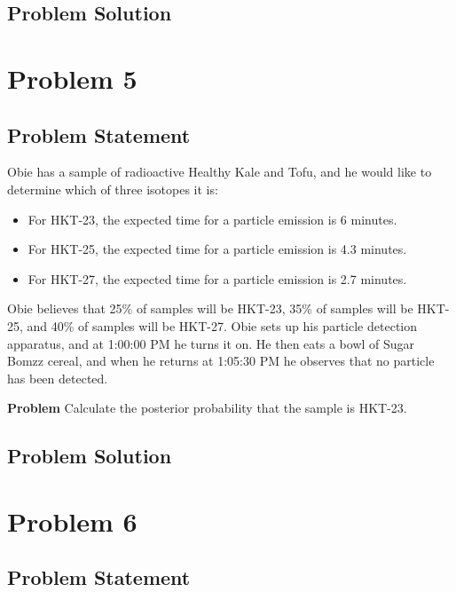 \documentclass[12pt]{article}
\theoremstyle{definition}
\begin{document}
\subsection*{Problem Solution}




\newpage
\section*{Problem 5}

\subsection*{Problem Statement}

Obie has a sample of radioactive Healthy Kale and Tofu, and he would like to determine which of three isotopes it is:
\begin{itemize}
	\item For HKT-23, the expected time for a particle emission is 6 minutes.
	\item For HKT-25, the expected time for a particle emission is 4.3 minutes.
	\item For HKT-27, the expected time for a particle emission is 2.7 minutes.
\end{itemize}
Obie believes that 25\% of samples will be HKT-23, 35\% of samples will be HKT-25, and 40\% of samples will be HKT-27.
Obie sets up his particle detection apparatus, and at 1:00:00 PM he turns it on. He then eats a bowl of Sugar Bomzz cereal, and when he returns at 1:05:30 PM he observes that no particle has been detected.

\bigskip
\noindent
{\bf Problem} Calculate the posterior probability that the sample is HKT-23.


\subsection*{Problem Solution}




\newpage
\section*{Problem 6}

\subsection*{Problem Statement}
\end{document}
